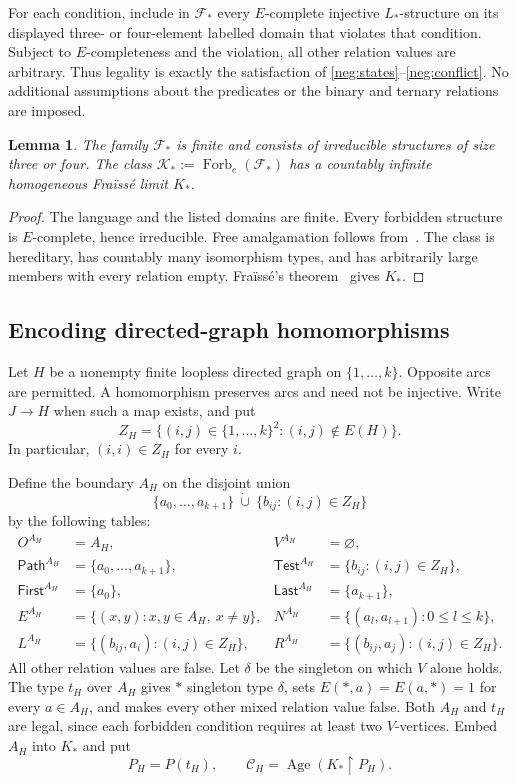 \documentclass{article}
\numberwithin{equation}{section}
\newtheorem{lemma}[theorem]{Lemma}
\theoremstyle{definition}
\DeclareMathOperator{\Age}{Age}
\newcommand{\res}{\mathbin{\upharpoonright}}
\begin{document}
For each condition, include in $\mathcal F_*$ every $E$-complete injective
$L_*$-structure on its displayed three- or four-element labelled domain
that violates that condition. Subject to $E$-completeness and the violation,
all other relation values are arbitrary.
Thus legality is exactly the satisfaction of
\eqref{neg:states}--\eqref{neg:conflict}. No additional assumptions about
the predicates or the binary and ternary relations are imposed.

\begin{lemma}\label{neg:fraisse}
The family $\mathcal F_*$ is finite and consists of irreducible structures
of size three or four. The class
$\mathcal K_*:=\operatorname{Forb}_{e}(\mathcal F_*)$ has a countably
infinite homogeneous Fra\"iss\'e limit $K_*$.
\end{lemma}

\begin{proof}
The language and the listed domains are finite. Every forbidden structure
is $E$-complete, hence irreducible. Free amalgamation follows
from~\cite[Theorem~3.2]{SauerCanonicalVertex2003}. The class is hereditary, has countably many
isomorphism types, and has arbitrarily large members with every relation
empty. Fra\"iss\'e's theorem~\cite{Fraisse} gives $K_*$.
\end{proof}

\subsection{Encoding directed-graph homomorphisms}
\label{neg:encoding}

Let $H$ be a nonempty finite loopless directed graph on $\{1,\ldots,k\}$.
Opposite arcs are permitted. A homomorphism preserves arcs and need not be
injective. Write $J\to H$ when such a map exists, and put
\[
 Z_H=\{(i,j)\in\{1,\ldots,k\}^2:(i,j)\notin E(H)\}.
\]
In particular, $(i,i)\in Z_H$ for every $i$.

Define the boundary $A_H$ on the disjoint union
\[
 \{a_0,\ldots,a_{k+1}\}\ \dot\cup\
 \{b_{ij}:(i,j)\in Z_H\}
\]
by the following tables:
\begin{align*}
 O^{A_H}&=A_H,&V^{A_H}&=\varnothing,\\
 \mathsf{Path}^{A_H}&=\{a_0,\ldots,a_{k+1}\},&
 \mathsf{Test}^{A_H}&=\{b_{ij}:(i,j)\in Z_H\},\\
 \mathsf{First}^{A_H}&=\{a_0\},&
 \mathsf{Last}^{A_H}&=\{a_{k+1}\},\\
 E^{A_H}&=\{(x,y):x,y\in A_H,\ x\ne y\},&
 N^{A_H}&=\{(a_l,a_{l+1}):0\le l\le k\},\\
 L^{A_H}&=\{(b_{ij},a_i):(i,j)\in Z_H\},&
 R^{A_H}&=\{(b_{ij},a_j):(i,j)\in Z_H\}.
\end{align*}
All other relation values are false. Let $\delta$ be the singleton on which
$V$ alone holds. The type $t_H$ over $A_H$ gives $*$ singleton type $\delta$,
sets $E(*,a)=E(a,*)=1$ for every $a\in A_H$, and makes every other mixed
relation value false. Both $A_H$ and $t_H$ are legal, since each forbidden
condition requires at least two $V$-vertices. Embed $A_H$ into $K_*$ and put
\[
 P_H=P(t_H),\qquad \mathcal C_H=\Age(K_*\res P_H).
\]
\end{document}
